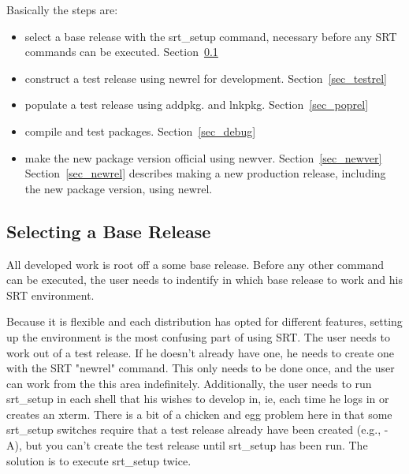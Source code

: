 \documentclass[12pt]{article}
\begin{document}
Basically the steps are:

\begin{itemize}

\item select a base release with the srt\_setup command, necessary before any SRT 
commands can be executed. 
Section~\ref{sec_setup}

\item 
construct a test release using {\ttfamily newrel}  
for development.
Section~\ref{sec_testrel}

\item 
populate a test release using 
{\ttfamily addpkg}.  and {\ttfamily lnkpkg}.
Section~\ref{sec_poprel}                                

\item 
compile and test packages. Section~\ref{sec_debug}

\item make the new package version official 
using {\ttfamily newver}. Section~\ref{sec_newver}
Section~\ref{sec_newrel} describes making a new
production release, including the new package version, using {\ttfamily newrel}.

\end{itemize}

\subsection{Selecting a Base Release}
\label{sec_setup}

All developed work is root off a some base release. Before any
other command can be executed, the user needs to indentify in which
base release to work and his SRT environment. 

Because it is flexible and each distribution has opted for different
features, setting up the environment is the most confusing part of using 
SRT. The user needs to work out of a test release. If he doesn't already have
one, he needs to create one with the SRT "newrel" command. This only needs
to be done once, and the user can work from the this area indefinitely. 
Additionally, the user needs to run srt\_setup in each shell that his wishes
to develop in, ie, each time he logs in or creates an xterm. There is a bit
of a chicken and egg problem here in that some srt\_setup switches require that
a test release already have been created (e.g., -A), but you can't create the 
test
release until srt\_setup has been run. The solution is to execute srt\_setup
twice. 
\end{document}
